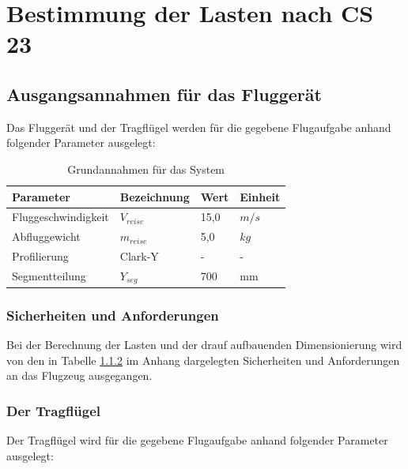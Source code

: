 \chapter{Bestimmung der Lasten nach CS 23}\label{cha:Bestimmung der Lasten nach CS 23}

\section{Ausgangsannahmen für das Fluggerät}

Das Fluggerät und der Tragflügel werden für die gegebene Flugaufgabe anhand folgender Parameter ausgelegt:

\begin{table}[h]
\centering
\begin{tabular}{|l|l|l|l|}
\hline
Parameter  & Bezeichnung &  Wert & Einheit \\ \hline
Fluggeschwindigkeit  & $V_{reise}$ & 15,0 & $m/s$\\ \hline
Abfluggewicht & $m_{reise}$  & 5,0 & $kg$\\ \hline
Profilierung & Clark-Y & - & - \\ \hline
Segmentteilung & $Y_{seg}$ & 700 & mm\\ \hline
\end{tabular}
\caption{Grundannahmen für das System}
\label{tab:Grundannahmen für das System}
\end{table}

\subsection{Sicherheiten und Anforderungen}

Bei der Berechnung der Lasten und der drauf aufbauenden Dimensionierung wird von den in Tabelle \ref{} im Anhang dargelegten Sicherheiten und Anforderungen an das Flugzeug  ausgegangen.

\subsection{Der Tragflügel}

Der Tragflügel wird für die gegebene Flugaufgabe anhand folgender Parameter ausgelegt:

